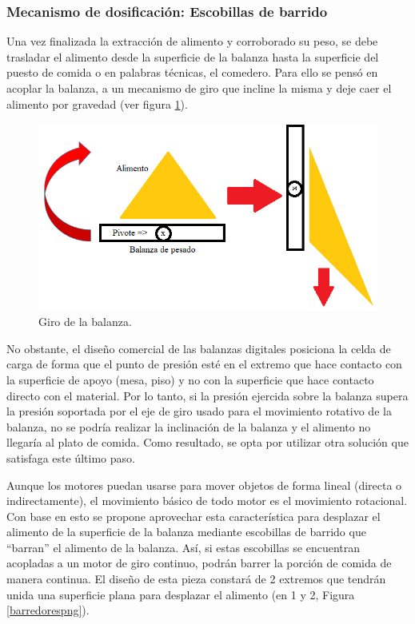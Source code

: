     \subsubsection{Mecanismo de  dosificación: Escobillas de barrido} \label{escobillas}
    
    Una vez finalizada la extracción de alimento y corroborado su peso, se debe trasladar el alimento desde la superficie de la balanza hasta la superficie del puesto de comida o en palabras técnicas, el comedero. Para ello se pensó en acoplar la balanza, a un mecanismo de giro que incline la misma y deje caer el alimento por gravedad (ver figura \ref{girobalanzapng}).
    
    \begin{figure}[H]
	    \begin{center}
	    	\includegraphics[scale=0.60]{img/girobalanza.png}
        \end{center}
	    \caption{Giro de la balanza. \label{girobalanzapng}}
    \end{figure}
    
    No obstante, el diseño comercial de las balanzas digitales posiciona la celda de carga de forma que el punto de presión esté en el extremo que hace contacto con la superficie de apoyo (mesa, piso) y no con la superficie que hace contacto directo con el material. Por lo tanto, si la presión ejercida sobre la balanza supera la presión soportada por el eje de giro usado para el movimiento rotativo de la balanza, no se podría realizar la inclinación de la balanza y el alimento no llegaría al plato de comida.  Como resultado, se opta por utilizar otra solución que satisfaga este último paso.
    
    Aunque los motores puedan usarse para mover objetos de forma lineal (directa o indirectamente), el movimiento básico de todo motor es el movimiento rotacional. Con base en esto se propone aprovechar esta característica para desplazar el alimento de la superficie de la balanza mediante escobillas de barrido que ``barran'' el alimento de la balanza. Así, si estas escobillas se encuentran acopladas a un motor de giro continuo, podrán barrer la porción de comida de manera continua. El diseño de esta pieza constará de 2 extremos que tendrán unida una superficie plana  para desplazar el alimento (en 1 y 2, Figura \ref{barredorespng}).

